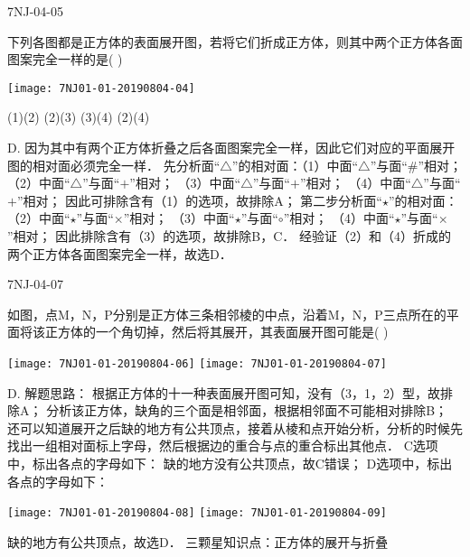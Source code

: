 \begin{defproblem}{7NJ-04-05}%
\begin{onlyproblem}%
下列各图都是正方体的表面展开图，若将它们折成正方体，则其中两个正方体各面图案完全一样的是(    ) 
\begin{center}
\texttt{[image: 7NJ01-01-20190804-04]}
\end{center}

\xx
{(1)(2)}
{(2)(3)}
{(3)(4)}
{(2)(4)}

\end{onlyproblem}%
\begin{onlysolution}%
\begin{solution}%
D.
因为其中有两个正方体折叠之后各面图案完全一样，因此它们对应的平面展开图的相对面必须完全一样．
先分析面“$\triangle$”的相对面：（1）中面“$\triangle$”与面“\#”相对； （2）中面“$\triangle$”与面“$+$”相对； （3）中面“$\triangle$”与面“$+$”相对； （4）中面“$\triangle$”与面“$+$”相对； 因此可排除含有（1）的选项，故排除A；
第二步分析面“$\star$”的相对面： （2）中面“$\star$”与面“$\times$”相对； （3）中面“$\star$”与面“$\circ$”相对； （4）中面“$\star$”与面“$\times$”相对； 因此排除含有（3）的选项，故排除B，C． 经验证（2）和（4）折成的两个正方体各面图案完全一样，故选D．
\end{solution}%
\end{onlysolution}%
\end{defproblem}








\begin{defproblem}{7NJ-04-07}%
\begin{onlyproblem}%
如图，点M，N，P分别是正方体三条相邻棱的中点，沿着M，N，P三点所在的平面将该正方体的一个角切掉，然后将其展开，其表面展开图可能是(    )  
\begin{center}
\texttt{[image: 7NJ01-01-20190804-06]}
\texttt{[image: 7NJ01-01-20190804-07]}
\end{center}


\end{onlyproblem}%
\begin{onlysolution}%
\begin{solution}%
D.
解题思路： 根据正方体的十一种表面展开图可知，没有（3，1，2）型，故排除A； 分析该正方体，缺角的三个面是相邻面，根据相邻面不可能相对排除B； 还可以知道展开之后缺的地方有公共顶点，接着从棱和点开始分析，分析的时候先找出一组相对面标上字母，然后根据边的重合与点的重合标出其他点． C选项中，标出各点的字母如下：   缺的地方没有公共顶点，故C错误； D选项中，标出各点的字母如下：
\begin{center}
\texttt{[image: 7NJ01-01-20190804-08]}
\texttt{[image: 7NJ01-01-20190804-09]}
\end{center}
 缺的地方有公共顶点，故选D． 
三颗星知识点：正方体的展开与折叠  
\end{solution}%
\end{onlysolution}%
\end{defproblem}




